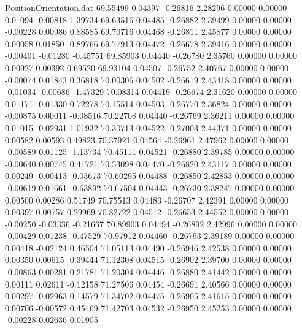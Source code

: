 \begin{filecontents}{PositionOrientation.dat}
  69.55499    0.04397   -0.26816     2.28296    0.00000    0.00000    0.01094   -0.00818    1.39734
  69.63516    0.04485   -0.26882     2.39499    0.00000    0.00000   -0.00228    0.00986    0.88585
  69.70716    0.04468   -0.26811     2.45877    0.00000    0.00000    0.00058    0.01850   -0.89766
  69.77913    0.04472   -0.26678     2.39416    0.00000    0.00000   -0.00401   -0.01280   -0.45751
  69.85903    0.04440   -0.26780     2.35760    0.00000    0.00000    0.00927    0.00392    0.69520
  69.93104    0.04507   -0.26752     2.40767    0.00000    0.00000   -0.00074    0.01843    0.36818
  70.00306    0.04502   -0.26619     2.43418    0.00000    0.00000   -0.01034   -0.00686   -1.47329
  70.08314    0.04419   -0.26674     2.31620    0.00000    0.00000    0.01171   -0.01330    0.72278
  70.15514    0.04503   -0.26770     2.36824    0.00000    0.00000   -0.00875    0.00011   -0.08516
  70.22708    0.04440   -0.26769     2.36211    0.00000    0.00000    0.01015   -0.02931    1.01932
  70.30713    0.04522   -0.27003     2.44371    0.00000    0.00000    0.00582    0.00593    0.49823
  70.37921    0.04564   -0.26961     2.47962    0.00000    0.00000   -0.00589    0.01125   -1.13734
  70.45111    0.04521   -0.26880     2.39785    0.00000    0.00000   -0.00640    0.00745    0.41721
  70.53098    0.04470   -0.26820     2.43117    0.00000    0.00000    0.00249   -0.00413   -0.03673
  70.60295    0.04488   -0.26850     2.42853    0.00000    0.00000   -0.00619    0.01661   -0.63892
  70.67504    0.04443   -0.26730     2.38247    0.00000    0.00000    0.00500    0.00286    0.51749
  70.75513    0.04483   -0.26707     2.42391    0.00000    0.00000    0.00397    0.00757    0.29969
  70.82722    0.04512   -0.26653     2.44552    0.00000    0.00000   -0.00250   -0.03336   -0.21667
  70.89903    0.04494   -0.26892     2.42996    0.00000    0.00000   -0.00429    0.01238   -0.47529
  70.97912    0.04460   -0.26793     2.39189    0.00000    0.00000    0.00418   -0.02124    0.46504
  71.05113    0.04490   -0.26946     2.42538    0.00000    0.00000    0.00350    0.00615   -0.39444
  71.12308    0.04515   -0.26902     2.39700    0.00000    0.00000   -0.00863    0.00281    0.21781
  71.20304    0.04446   -0.26880     2.41442    0.00000    0.00000    0.00111    0.02611   -0.12158
  71.27506    0.04454   -0.26691     2.40566    0.00000    0.00000    0.00297   -0.02963    0.14579
  71.34702    0.04475   -0.26905     2.41615    0.00000    0.00000    0.00706   -0.00572    0.45469
  71.42703    0.04532   -0.26950     2.45253    0.00000    0.00000   -0.00228    0.02636    0.01905

\end{filecontents}
